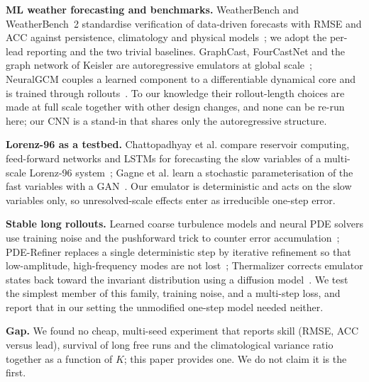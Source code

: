 \textbf{ML weather forecasting and benchmarks.} WeatherBench and WeatherBench~2 standardise verification of data-driven forecasts with RMSE and ACC against persistence, climatology and physical models~\cite{rasp2020weatherbench,rasp2023weatherbench}; we adopt the per-lead reporting and the two trivial baselines. GraphCast, FourCastNet and the graph network of Keisler are autoregressive emulators at global scale~\cite{lam2022graphcast,pathak2022fourcastnet,keisler2022forecasting}; NeuralGCM couples a learned component to a differentiable dynamical core and is trained through rollouts~\cite{kochkov2023neural}. To our knowledge their rollout-length choices are made at full scale together with other design changes, and none can be re-run here; our CNN is a stand-in that shares only the autoregressive structure.

\textbf{Lorenz-96 as a testbed.} Chattopadhyay et al. compare reservoir computing, feed-forward networks and LSTMs for forecasting the slow variables of a multi-scale Lorenz-96 system~\cite{chattopadhyay2019data}; Gagne et al. learn a stochastic parameterisation of the fast variables with a GAN~\cite{gagne2019machine}. Our emulator is deterministic and acts on the slow variables only, so unresolved-scale effects enter as irreducible one-step error.

\textbf{Stable long rollouts.} Learned coarse turbulence models and neural PDE solvers use training noise and the pushforward trick to counter error accumulation~\cite{stachenfeld2021learned,brandstetter2022message}; PDE-Refiner replaces a single deterministic step by iterative refinement so that low-amplitude, high-frequency modes are not lost~\cite{lippe2023pde}; Thermalizer corrects emulator states back toward the invariant distribution using a diffusion model~\cite{pedersen2025thermalizer}. We test the simplest member of this family, training noise, and a multi-step loss, and report that in our setting the unmodified one-step model needed neither.

\textbf{Gap.} We found no cheap, multi-seed experiment that reports skill (RMSE, ACC versus lead), survival of long free runs and the climatological variance ratio together as a function of $K$; this paper provides one. We do not claim it is the first.
